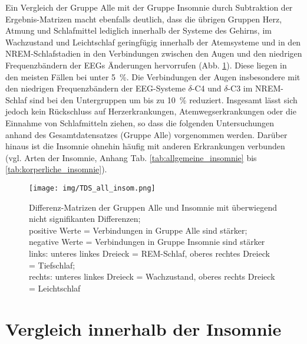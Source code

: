 Ein Vergleich der Gruppe Alle mit der Gruppe Insomnie durch Subtraktion der Ergebnis-Matrizen macht ebenfalls deutlich, dass die übrigen Gruppen Herz, Atmung und Schlafmittel lediglich innerhalb der Systeme des Gehirns, im Wachzustand und Leichtschlaf geringfügig innerhalb der Atemsysteme und in den \acs{NREM}-Schlafstadien in den Verbindungen zwischen den Augen und den niedrigen Frequenzbändern der \acs{EEG}s Änderungen hervorrufen (Abb. \ref{fig:TDSall_insom}). Diese liegen in den meisten Fällen bei unter 5~\%. Die Verbindungen der Augen insbesondere mit den niedrigen Frequenzbändern der \acs{EEG}-Systeme $\delta$-C4 und $\delta$-C3 im \acs{NREM}-Schlaf sind bei den Untergruppen um bis zu 10~\% reduziert. Insgesamt lässt sich jedoch kein Rückschluss auf Herzerkrankungen, Atemwegserkrankungen oder die Einnahme von Schlafmitteln ziehen, so dass die folgenden Untersuchungen anhand des Gesamtdatensatzes (Gruppe Alle) vorgenommen werden. Darüber hinaus ist die Insomnie ohnehin häufig mit anderen Erkrankungen verbunden (vgl. Arten der Insomnie, Anhang Tab. \ref{tab:allgemeine_insomnie} bis \ref{tab:korperliche_insomnie}). 

\begin{figure}[H]
	\centering
	\texttt{[image: img/TDS\_all\_insom.png]}
	\caption[Differenzen zwischen Gruppe Alle und Insomnie]{Differenz-Matrizen der Gruppen Alle und Insomnie mit überwiegend nicht signifikanten Differenzen;\\positive Werte = Verbindungen in Gruppe Alle sind stärker;\\negative Werte = Verbindungen in Gruppe Insomnie sind stärker\\links: unteres linkes Dreieck = \acs{REM}-Schlaf, oberes rechtes Dreieck = Tiefschlaf;\\rechts: unteres linkes Dreieck = Wachzustand, oberes rechts Dreieck = Leichtschlaf}
	\label{fig:TDSall_insom}
\end{figure}

\section{Vergleich innerhalb der Insomnie}

